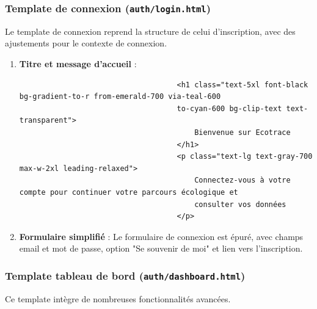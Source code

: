 \documentclass[a4paper,11pt]{article}
\begin{document}
                \subsubsection{Template de connexion (\texttt{auth/login.html})}
                    \noindent Le template de connexion reprend la structure de celui d'inscription, avec des ajustements pour le contexte de connexion.

                    \begin{enumerate}
                        \item \textbf{Titre et message d'accueil} :
                            \begin{tcolorbox}[colback=lightgray!6, colframe=black, left=-70mm, right=5mm, top=2mm, bottom=0mm, boxrule=0.1mm]
                                \begin{verbatim}
                                    <h1 class="text-5xl font-black bg-gradient-to-r from-emerald-700 via-teal-600
                                    to-cyan-600 bg-clip-text text-transparent">
                                        Bienvenue sur Ecotrace
                                    </h1>
                                    <p class="text-lg text-gray-700 max-w-2xl leading-relaxed">
                                        Connectez-vous à votre compte pour continuer votre parcours écologique et 
                                        consulter vos données
                                    </p>
                                \end{verbatim}
                            \end{tcolorbox}

                        \item \textbf{Formulaire simplifié} : Le formulaire de connexion est épuré, avec champs email et mot de passe, option "Se souvenir de moi" et lien vers l'inscription.
                    \end{enumerate}

                \subsubsection{Template tableau de bord (\texttt{auth/dashboard.html})}
                    \noindent Ce template intègre de nombreuses fonctionnalités avancées.
\end{document}
